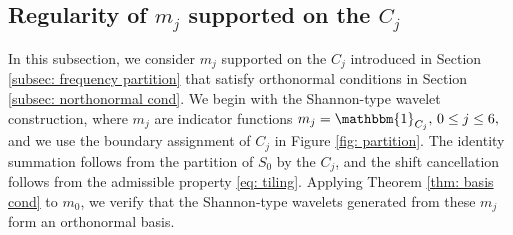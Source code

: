 \subsection{Regularity of $m_j$ supported on the $C_j$}\label{sec: design}

In this subsection, we consider $m_j$ supported on the $C_j$ introduced in Section \ref{subsec: frequency partition} that satisfy orthonormal conditions in Section \ref{subsec: northonormal cond}. We begin with the Shannon-type wavelet construction,
where $m_j$ are indicator functions $ m_j = \mathbbm{1}_{C_j},\,0\leq j \leq 6,\,$ and we use the boundary assignment of $C_j$ in Figure \ref{fig: partition}.
The identity summation follows from the partition of $S_0$ by the $C_j$, and the shift cancellation follows from the admissible property \eqref{eq: tiling}. %
Applying Theorem \ref{thm: basis cond} to $m_0$, we verify that the Shannon-type wavelets generated from these $m_j$ form an orthonormal basis.

